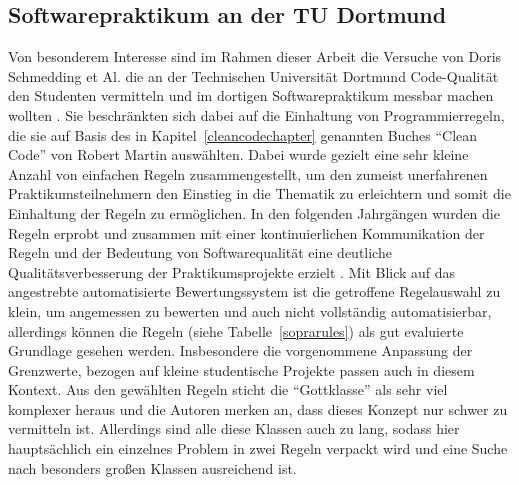 \documentclass[da,ngerman]{stthesis}
\begin{document}
			\subsection{Softwarepraktikum an der TU Dortmund}
				Von besonderem Interesse sind im Rahmen dieser Arbeit die Versuche von Doris Schmedding et Al. die an der Technischen Universität Dortmund Code-Qualität den Studenten vermitteln und im dortigen Softwarepraktikum messbar machen wollten \cite{CleanCodeImPraktikum}. Sie beschränkten sich dabei auf die Einhaltung von Programmierregeln, die sie auf Basis des in Kapitel~\ref{cleancodechapter} genannten Buches "`Clean Code"' von Robert Martin auswählten. Dabei wurde gezielt eine sehr kleine Anzahl von einfachen Regeln zusammengestellt, um den zumeist unerfahrenen Praktikumsteilnehmern den Einstieg in die Thematik zu erleichtern und somit die Einhaltung der Regeln zu ermöglichen. In den folgenden Jahrgängen wurden die Regeln erprobt und zusammen mit einer kontinuierlichen Kommunikation der Regeln und der Bedeutung von Softwarequalität eine deutliche Qualitätsverbesserung der Praktikumsprojekte erzielt \cite{ImproveCodeQuality}. \newline
				Mit Blick auf das angestrebte automatisierte Bewertungssystem ist die getroffene Regelauswahl zu klein, um angemessen zu bewerten und auch nicht vollständig automatisierbar, allerdings können die Regeln (siehe Tabelle~\ref{soprarules}) als gut evaluierte Grundlage gesehen werden. Insbesondere die vorgenommene Anpassung der Grenzwerte, bezogen auf kleine studentische Projekte passen auch in diesem Kontext. \newline
				Aus den gewählten Regeln sticht die "`Gottklasse"' als sehr viel komplexer heraus und die Autoren merken an, dass dieses Konzept nur schwer zu vermitteln ist. Allerdings sind alle diese Klassen auch zu lang, sodass hier hauptsächlich ein einzelnes Problem in zwei Regeln verpackt wird und eine Suche nach besonders großen Klassen ausreichend ist.\newline \newline
\end{document}

